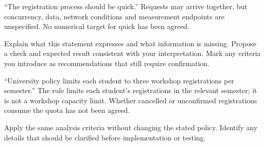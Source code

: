 \answerlabel\blankbox{2.8cm}
\begin{contenttable}
{“The registration process should be quick.”}
{Requests may arrive together, but concurrency, data, network conditions and measurement endpoints are unspecified. No numerical target for quick has been agreed.}

\end{contenttable}
{Explain what this statement expresses and what information is missing. Propose a check and expected result consistent with your interpretation. Mark any criteria you introduce as recommendations that still require confirmation.}

\answerlabel\answerfill
\newpage
\begin{contenttable}
{“University policy limits each student to three workshop registrations per semester.”}
{The rule limits each student’s registrations in the relevant semester; it is not a workshop capacity limit. Whether cancelled or unconfirmed registrations consume the quota has not been agreed.}
\end{contenttable}
{Apply the same analysis criteria without changing the stated policy. Identify any details that should be clarified before implementation or testing.}

